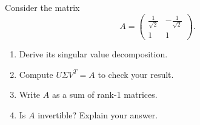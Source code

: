 {\color{red}	Consider the matrix
	$$A = \begin{pmatrix}
	\frac{1}{\sqrt{2}} &-\frac{1}{\sqrt{2}}\\
	1&1
	\end{pmatrix}.$$
\begin{enumerate}
		\item Derive its singular value decomposition.
		\item Compute $U\Sigma V^T = A$ to check your result.
		\item Write $A$ as a sum of rank-1 matrices.
		\item Is $A$ invertible? Explain your answer.
\end{enumerate}
}